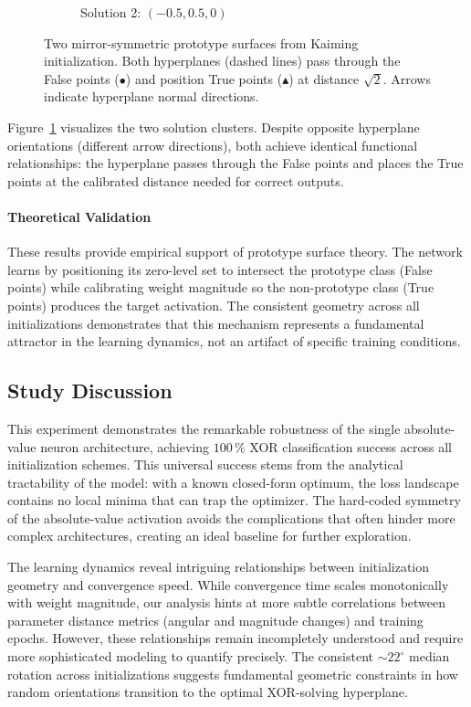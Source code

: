 \begin{figure}[ht]
\begin{subfigure}{0.46\textwidth}
   \caption{Solution 2: $(-0.5, 0.5, 0)$}
 \end{subfigure}
 \caption{Two mirror-symmetric prototype surfaces from Kaiming initialization. Both hyperplanes (dashed lines) pass through the False points ($\bullet$) and position True points ($\blacktriangle$) at distance $\sqrt{2}$. Arrows indicate hyperplane normal directions.}
 \label{fig:abs1-hyperplanes}
\end{figure}

Figure~\ref{fig:abs1-hyperplanes} visualizes the two solution clusters. Despite opposite hyperplane orientations (different arrow directions), both achieve identical functional relationships: the hyperplane passes through the False points and places the True points at the calibrated distance needed for correct outputs.

\paragraph{Theoretical Validation}
These results provide empirical support of prototype surface theory. The network learns by positioning its zero-level set to intersect the prototype class (False points) while calibrating weight magnitude so the non-prototype class (True points) produces the target activation. The consistent geometry across all initializations demonstrates that this mechanism represents a fundamental attractor in the learning dynamics, not an artifact of specific training conditions.


\subsection*{Study Discussion}

This experiment demonstrates the remarkable robustness of the single absolute-value neuron architecture, achieving $100\,\%$ XOR classification success across all initialization schemes. This universal success stems from the analytical tractability of the model: with a known closed-form optimum, the loss landscape contains no local minima that can trap the optimizer. The hard-coded symmetry of the absolute-value activation avoids the complications that often hinder more complex architectures, creating an ideal baseline for further exploration.

The learning dynamics reveal intriguing relationships between initialization geometry and convergence speed. While convergence time scales monotonically with weight magnitude, our analysis hints at more subtle correlations between parameter distance metrics (angular and magnitude changes) and training epochs. However, these relationships remain incompletely understood and require more sophisticated modeling to quantify precisely. The consistent $\sim22^\circ$ median rotation across initializations suggests fundamental geometric constraints in how random orientations transition to the optimal XOR-solving hyperplane.

